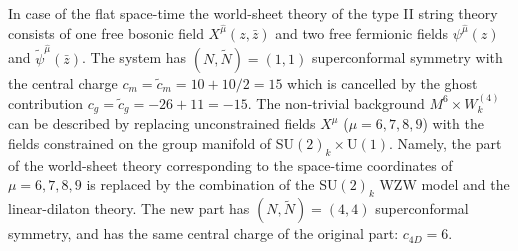 \documentclass[a4paper,prd,preprint]{revtex4}
\begin{document}
In case of the flat space-time
 the world-sheet theory of the type II string theory
 consists of one free bosonic field $X^{\hat \mu}(z,{\bar z})$
 and two free fermionic fields
 $\psi^{\hat \mu}(z)$ and ${\tilde \psi}^{\hat \mu}({\bar z})$.
The system has $(N,{\tilde N})=(1,1)$ superconformal symmetry
 with the central charge $c_m={\tilde c}_m=10+10/2=15$
 which is cancelled by the ghost contribution
 $c_g={\tilde c}_g=-26+11=-15$.
The non-trivial background $M^6 \times W^{(4)}_k$
 can be described by replacing unconstrained fields
 $X^\mu$ ($\mu=6,7,8,9$)
 with the fields constrained on the group manifold of
 SU$(2)_k \times$U$(1)$.
Namely,
 the part of the world-sheet theory
 corresponding to the space-time coordinates of $\mu=6,7,8,9$
 is replaced by the combination of the SU$(2)_k$ WZW model
 and the linear-dilaton theory.
The new part has $(N,{\tilde N})=(4,4)$ superconformal symmetry,
 and has the same central charge of the original part:
 $c_{4D}=6$.
\end{document}
